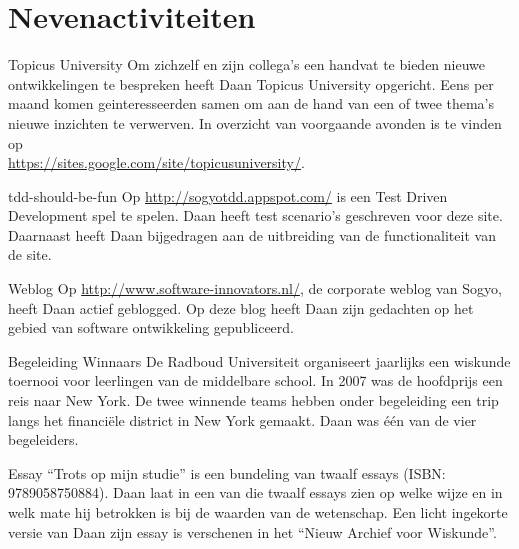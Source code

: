 \section*{Nevenactiviteiten}

	\begin{subActivityList}
		\item[Topicus University] Om zichzelf en zijn collega's een handvat te
		bieden nieuwe ontwikkelingen te bespreken heeft Daan Topicus University
		opgericht. Eens per maand komen geinteresseerden samen om aan de hand
		van een of twee thema's nieuwe inzichten te verwerven. In overzicht
		van voorgaande avonden is te vinden op\\
		\url{https://sites.google.com/site/topicusuniversity/}.\hfill\\
	
		\item[tdd-should-be-fun] Op \url{http://sogyotdd.appspot.com/} is een
		Test Driven Development spel te spelen. Daan heeft test scenario's
		geschreven voor deze site. Daarnaast heeft Daan bijgedragen aan de
		uitbreiding van de functionaliteit van de site.\hfill\\
	
		\item[Weblog] Op \url{http://www.software-innovators.nl/}, de corporate
		weblog van Sogyo, heeft Daan actief geblogged. Op deze blog heeft
		Daan zijn gedachten op het gebied van software ontwikkeling gepubliceerd.
		\hfill\\
		
		\item[Begeleiding Winnaars] De Radboud Universiteit organiseert
		jaarlijks een wiskunde toernooi voor leerlingen van de middelbare
		school. In 2007 was de hoofdprijs een reis naar New York. De twee
		winnende teams hebben onder begeleiding een trip langs het financi\"ele
		district in New York gemaakt. Daan was \'e\'en van de vier begeleiders.
		\hfill\\
		
		\item[Essay] ``Trots op mijn studie'' is een bundeling van twaalf essays
		(ISBN: 9789058750884). Daan laat in een van die twaalf essays zien op
		welke wijze en in welk mate hij betrokken is bij de waarden van de
		wetenschap.
		Een licht ingekorte versie van Daan zijn essay is verschenen in het
		``Nieuw Archief voor Wiskunde''.		
		\hfill\\
	\end{subActivityList}
